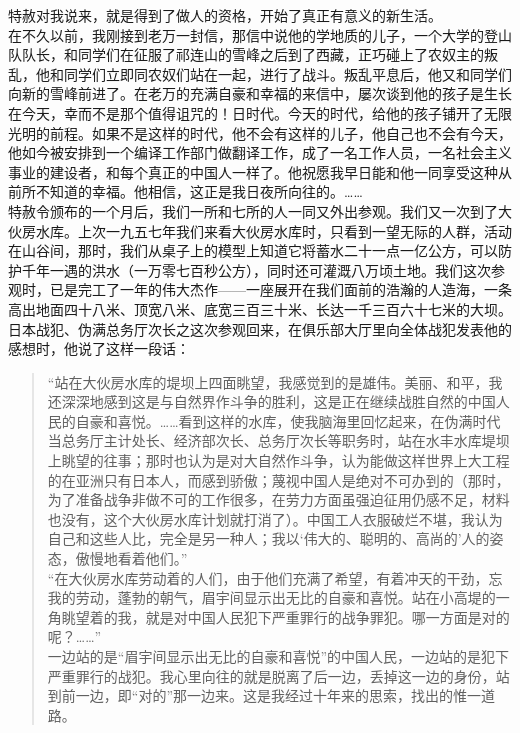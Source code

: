 特赦对我说来，就是得到了做人的资格，开始了真正有意义的新生活。\\

在不久以前，我刚接到老万一封信，那信中说他的学地质的儿子，一个大学的登山队队长，和同学们在征服了祁连山的雪峰之后到了西藏，正巧碰上了农奴主的叛乱，他和同学们立即同农奴们站在一起，进行了战斗。叛乱平息后，他又和同学们向新的雪峰前进了。在老万的充满自豪和幸福的来信中，屡次谈到他的孩子是生长在今天，幸而不是那个值得诅咒的！日时代。今天的时代，给他的孩子铺开了无限光明的前程。如果不是这样的时代，他不会有这样的儿子，他自己也不会有今天，他如今被安排到一个编译工作部门做翻译工作，成了一名工作人员，一名社会主义事业的建设者，和每个真正的中国人一样了。他祝愿我早日能和他一同享受这种从前所不知道的幸福。他相信，这正是我日夜所向往的。……\\

特赦令颁布的一个月后，我们一所和七所的人一同又外出参观。我们又一次到了大伙房水库。上次一九五七年我们来看大伙房水库时，只看到一望无际的人群，活动在山谷间，那时，我们从桌子上的模型上知道它将蓄水二十一点一亿公方，可以防护千年一遇的洪水（一万零七百秒公方），同时还可灌溉八万顷土地。我们这次参观时，已是完工了一年的伟大杰作——一座展开在我们面前的浩瀚的人造海，一条高出地面四十八米、顶宽八米、底宽三百三十米、长达一千三百六十七米的大坝。日本战犯、伪满总务厅次长之这次参观回来，在俱乐部大厅里向全体战犯发表他的感想时，他说了这样一段话：\\

\begin{quote}
	“站在大伙房水库的堤坝上四面眺望，我感觉到的是雄伟。美丽、和平，我还深深地感到这是与自然界作斗争的胜利，这是正在继续战胜自然的中国人民的自豪和喜悦。……看到这样的水库，使我脑海里回忆起来，在伪满时代当总务厅主计处长、经济部次长、总务厅次长等职务时，站在水丰水库堤坝上眺望的往事；那时也认为是对大自然作斗争，认为能做这样世界上大工程的在亚洲只有日本人，而感到骄傲；蔑视中国人是绝对不可办到的（那时，为了准备战争非做不可的工作很多，在劳力方面虽强迫征用仍感不足，材料也没有，这个大伙房水库计划就打消了）。中国工人衣服破烂不堪，我认为自己和这些人比，完全是另一种人；我以‘伟大的、聪明的、高尚的’人的姿态，傲慢地看着他们。”\\

“在大伙房水库劳动着的人们，由于他们充满了希望，有着冲天的干劲，忘我的劳动，蓬勃的朝气，眉宇间显示出无比的自豪和喜悦。站在小高堤的一角眺望着的我，就是对中国人民犯下严重罪行的战争罪犯。哪一方面是对的呢？……”\\

一边站的是“眉宇间显示出无比的自豪和喜悦”的中国人民，一边站的是犯下严重罪行的战犯。我心里向往的就是脱离了后一边，丢掉这一边的身份，站到前一边，即“对的”那一边来。这是我经过十年来的思索，找出的惟一道路。\\
\end{quote}

